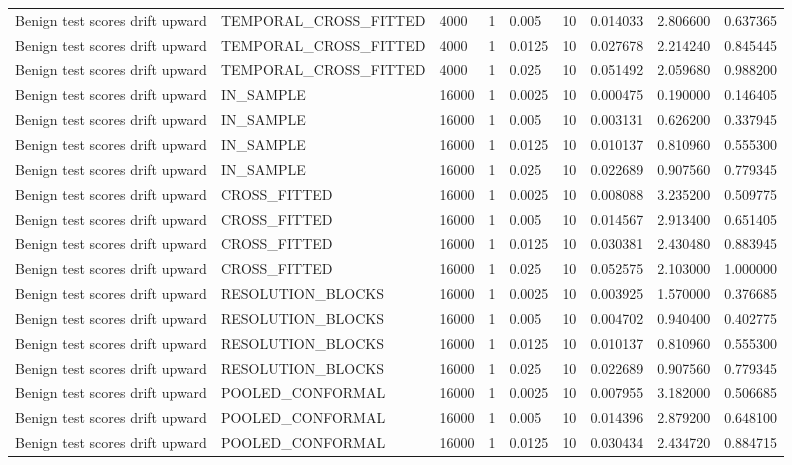 \begin{tabular}{lllllllll}
Benign test scores drift upward & TEMPORAL\_CROSS\_FITTED & 4000 & 1 & 0.005 & 10 & 0.014033 & 2.806600 & 0.637365 \\
Benign test scores drift upward & TEMPORAL\_CROSS\_FITTED & 4000 & 1 & 0.0125 & 10 & 0.027678 & 2.214240 & 0.845445 \\
Benign test scores drift upward & TEMPORAL\_CROSS\_FITTED & 4000 & 1 & 0.025 & 10 & 0.051492 & 2.059680 & 0.988200 \\
Benign test scores drift upward & IN\_SAMPLE & 16000 & 1 & 0.0025 & 10 & 0.000475 & 0.190000 & 0.146405 \\
Benign test scores drift upward & IN\_SAMPLE & 16000 & 1 & 0.005 & 10 & 0.003131 & 0.626200 & 0.337945 \\
Benign test scores drift upward & IN\_SAMPLE & 16000 & 1 & 0.0125 & 10 & 0.010137 & 0.810960 & 0.555300 \\
Benign test scores drift upward & IN\_SAMPLE & 16000 & 1 & 0.025 & 10 & 0.022689 & 0.907560 & 0.779345 \\
Benign test scores drift upward & CROSS\_FITTED & 16000 & 1 & 0.0025 & 10 & 0.008088 & 3.235200 & 0.509775 \\
Benign test scores drift upward & CROSS\_FITTED & 16000 & 1 & 0.005 & 10 & 0.014567 & 2.913400 & 0.651405 \\
Benign test scores drift upward & CROSS\_FITTED & 16000 & 1 & 0.0125 & 10 & 0.030381 & 2.430480 & 0.883945 \\
Benign test scores drift upward & CROSS\_FITTED & 16000 & 1 & 0.025 & 10 & 0.052575 & 2.103000 & 1.000000 \\
Benign test scores drift upward & RESOLUTION\_BLOCKS & 16000 & 1 & 0.0025 & 10 & 0.003925 & 1.570000 & 0.376685 \\
Benign test scores drift upward & RESOLUTION\_BLOCKS & 16000 & 1 & 0.005 & 10 & 0.004702 & 0.940400 & 0.402775 \\
Benign test scores drift upward & RESOLUTION\_BLOCKS & 16000 & 1 & 0.0125 & 10 & 0.010137 & 0.810960 & 0.555300 \\
Benign test scores drift upward & RESOLUTION\_BLOCKS & 16000 & 1 & 0.025 & 10 & 0.022689 & 0.907560 & 0.779345 \\
Benign test scores drift upward & POOLED\_CONFORMAL & 16000 & 1 & 0.0025 & 10 & 0.007955 & 3.182000 & 0.506685 \\
Benign test scores drift upward & POOLED\_CONFORMAL & 16000 & 1 & 0.005 & 10 & 0.014396 & 2.879200 & 0.648100 \\
Benign test scores drift upward & POOLED\_CONFORMAL & 16000 & 1 & 0.0125 & 10 & 0.030434 & 2.434720 & 0.884715 \\

\end{tabular}
